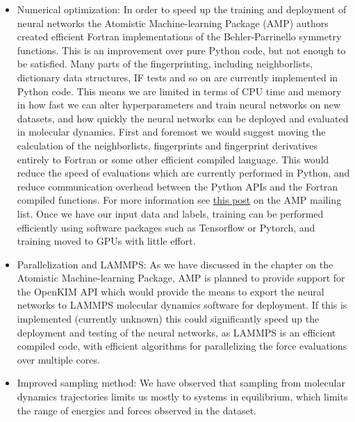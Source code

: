 \begin{itemize}
    \item Numerical optimization:
        In order to speed up the training and deployment of neural
        networks the Atomistic Machine-learning Package (AMP)
        authors created efficient Fortran implementations
        of the Behler-Parrinello symmetry functions.
        This is an improvement over pure Python code, but not enough to
        be satisfied.
        Many parts of the fingerprinting, including neighborlists,
        dictionary data structures, IF tests and so on are currently
        implemented in Python code. This means we are limited in terms
        of CPU time and memory in how fast we can alter hyperparameters
        and train neural networks on new datasets, and how quickly
        the neural networks can be deployed and evaluated in molecular dynamics.
        First and foremost we would suggest moving the calculation of
        the neighborlists, fingerprints and fingerprint derivatives entirely
        to Fortran or some other efficient compiled language.
        This would reduce the speed of evaluations which are currently performed
        in Python, and reduce communication overhead between the Python APIs
        and the Fortran compiled functions.
        For more information see \href{
            https://listserv.brown.edu/cgi-bin/wa?A2=AMP-USERS;d7c6c98c.1904}{
            this post} on the AMP mailing list.
        Once we have our input data and labels, training can be performed
        efficiently using software packages such as Tensorflow or Pytorch,
        and training moved to GPUs with little effort.
    \item Parallelization and LAMMPS:
        As we have discussed in the chapter on the Atomistic Machine-learning Package,
        AMP is planned to provide support for the OpenKIM API which would provide
        the means to export the neural networks to LAMMPS molecular dynamics
        software for deployment.
        If this is implemented (currently unknown) this could significantly speed up
        the deployment and testing of the neural networks, as LAMMPS 
        is an efficient compiled code,
        with efficient algorithms for parallelizing the force evaluations
        over multiple cores.
    \item Improved sampling method:
        We have observed that sampling from molecular dynamics trajectories
        limits us mostly to systems in equilibrium, which limits the
        range of energies and forces observed in the dataset.

\end{itemize}
